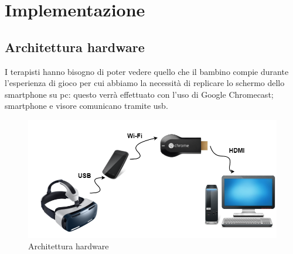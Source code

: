 \section{Implementazione} \label{sec:tecn}

\subsection{Architettura hardware} \label{subsec:hard}
I terapisti hanno bisogno di poter vedere quello che il bambino compie durante l'esperienza di gioco per cui abbiamo la necessità di replicare lo schermo dello smartphone su pc: questo verrà effettuato con l'uso di Google Chromecast; smartphone e visore comunicano tramite \acs{usb}.
\vspace{70pt}
\begin{figure}[htbp]
\centering
\includegraphics[width=\textwidth]{Images/hardware}
\caption{Architettura hardware}
\label{fig:hardware}
\end{figure}
\clearpage

